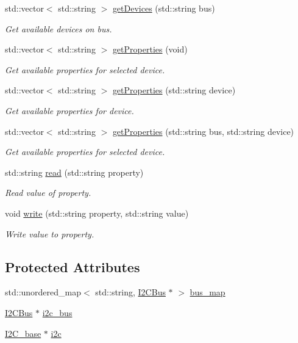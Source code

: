 \begin{DoxyCompactItemize}
std\+::vector$<$ std\+::string $>$ \hyperlink{class_board_ab137346e2910c2e18b5bfb31b958c43b}{get\+Devices} (std\+::string bus)
\begin{DoxyCompactList}\small\item\em Get available devices on bus. \end{DoxyCompactList}\item 
std\+::vector$<$ std\+::string $>$ \hyperlink{class_board_a6f3cc9b5301912690da4e0eb939b3081}{get\+Properties} (void)
\begin{DoxyCompactList}\small\item\em Get available properties for selected device. \end{DoxyCompactList}\item 
std\+::vector$<$ std\+::string $>$ \hyperlink{class_board_a1fab797a0fbec9d42b3462cb24488e8a}{get\+Properties} (std\+::string device)
\begin{DoxyCompactList}\small\item\em Get available properties for device. \end{DoxyCompactList}\item 
std\+::vector$<$ std\+::string $>$ \hyperlink{class_board_a6ddcad5c21427323e5062bd22feba405}{get\+Properties} (std\+::string bus, std\+::string device)
\begin{DoxyCompactList}\small\item\em Get available properties for selected device. \end{DoxyCompactList}\item 
std\+::string \hyperlink{class_board_a0b500bd590d15f797d1a36ecfeb0f5d4}{read} (std\+::string property)
\begin{DoxyCompactList}\small\item\em Read value of property. \end{DoxyCompactList}\item 
void \hyperlink{class_board_ab99bb344ee68485ab89e1ed5b9d79d4e}{write} (std\+::string property, std\+::string value)
\begin{DoxyCompactList}\small\item\em Write value to property. \end{DoxyCompactList}\end{DoxyCompactItemize}
\subsection*{Protected Attributes}
\begin{DoxyCompactItemize}
\item 
std\+::unordered\+\_\+map$<$ std\+::string, \hyperlink{class_i2_c_bus}{I2\+C\+Bus} $\ast$ $>$ \hyperlink{class_board_ac5fa25970ad12aa7d2c710bbcdd05339}{bus\+\_\+map}
\item 
\hyperlink{class_i2_c_bus}{I2\+C\+Bus} $\ast$ \hyperlink{class_board_a4458164bae62e6ba213a08a767242f9f}{i2c\+\_\+bus}
\item 
\hyperlink{class_i2_c__base}{I2\+C\+\_\+base} $\ast$ \hyperlink{class_board_aec7b3a540a138062fc54587e1040d917}{i2c}
\end{DoxyCompactItemize}


